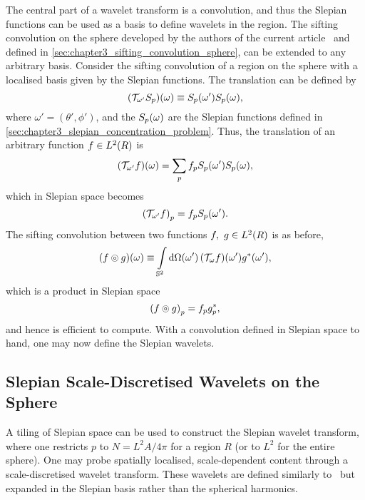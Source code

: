The central part of a wavelet transform is a convolution, and thus the Slepian functions can be used as a basis to define wavelets in the region.
The sifting convolution on the sphere developed by the authors of the current article~\cite{Roddy2021} and defined in \cref{sec:chapter3_sifting_convolution_sphere}, can be extended to any arbitrary basis.
Consider the sifting convolution of a region on the sphere with a localised basis given by the Slepian functions.
The translation can be defined by
%
\begin{equation}
	\pixel{(\translation{\omega'}\slepian{S})}
	\equiv \pixel[']{\slepian{S}} \pixel{\slepian{S}},
\end{equation}
%
where \(\omega'=(\theta',\phi')\), and the \(\pixel{\slepian{S}}\) are the Slepian functions defined in \cref{sec:chapter3_slepian_concentration_problem}.
Thus, the translation of an arbitrary function \(f \in \hilbert{R}\) is
%
\begin{equation}
	\pixel{(\translation{\omega'}f)} = \slepianSum \slepian{f} \pixel[']{\slepian{S}} \pixel{\slepian{S}},
\end{equation}
%
which in Slepian space becomes
%
\begin{equation}
	\slepian{(\translation{\omega'}f)} = \slepian{f} \pixel[']{\slepian{S}}.
\end{equation}
%
The sifting convolution between two functions \(f,\ g \in \hilbert{R}\) is as before, \ie{}
%
\begin{equation}
	\pixel{\convolution{f}{g}}
	\equiv \integrateSphere{\omega'} \pixel[']{(\translation{\omega}f)} \pixel[']{\conj{g}},
\end{equation}
%
which is a product in Slepian space
%
\begin{equation}
	\slepian{\convolution{f}{g}}
	= \slepian{f} \conj{\slepian{g}},
\end{equation}
%
and hence is efficient to compute.
With a convolution defined in Slepian space to hand, one may now define the Slepian wavelets.

\subsection{Slepian Scale-Discretised Wavelets on the Sphere}\label{sec:chapter3_slepian_scale_discretised_wavelets_sphere}

A tiling of Slepian space can be used to construct the Slepian wavelet transform, where one restricts \(p\) to \(N=L^{2}A/4\pi{}\) for a region \(R\) (or to \(L^{2}\) for the entire sphere).
One may probe spatially localised, scale-dependent content through a scale-discretised wavelet transform.
These wavelets are defined similarly to~\cite{Wiaux2008,McEwen2018} but expanded in the Slepian basis rather than the spherical harmonics.

